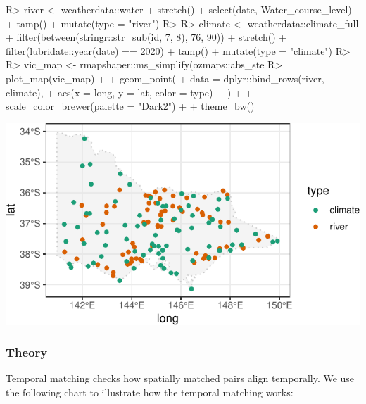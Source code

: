 \documentclass[
]{jss}
\begin{document}
\begin{CodeChunk}
\begin{CodeInput}
R> river <- weatherdata::water %
+   stretch() %
+   select(date, Water_course_level) %
+   tamp() %
+   mutate(type = "river")
R> 
R> climate <- weatherdata::climate_full %
+   filter(between(stringr::str_sub(id, 7, 8), 76, 90)) %
+   stretch() %
+   filter(lubridate::year(date) == 2020) %
+   tamp() %
+   mutate(type = "climate")
R> 
R> vic_map <- rmapshaper::ms_simplify(ozmaps::abs_ste %
R> plot_map(vic_map) +
+   geom_point(
+     data = dplyr::bind_rows(river, climate),
+     aes(x = long, y = lat, color = type)
+   ) +
+   scale_color_brewer(palette = "Dark2") +
+   theme_bw()
\end{CodeInput}


\begin{center}\includegraphics{figures/unnamed-chunk-18-1} \end{center}

\end{CodeChunk}

\hypertarget{theory}{%
\subsubsection{Theory}\label{theory}}

Temporal matching checks how spatially matched pairs align temporally.
We use the following chart to illustrate how the temporal matching
works:
\end{document}
